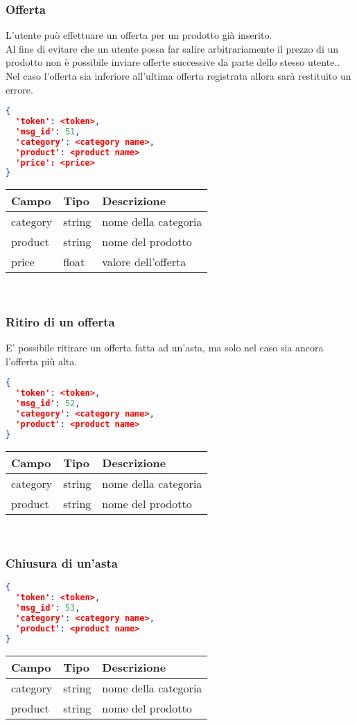 \subsubsection{Offerta}
L'utente può effettuare un offerta per un prodotto già inserito.\\
Al fine di evitare che un utente possa far salire arbitrariamente il prezzo di un prodotto non è possibile inviare offerte successive da parte dello stesso utente..\\
Nel caso l'offerta sia inferiore all'ultima offerta registrata allora sarà restituito un errore.
\begin{lstlisting}[language=json]
{
  'token': <token>,
  'msg_id': 51,
  'category': <category name>,
  'product': <product name>
  'price': <price>
}
\end{lstlisting}
\begin{tabular}{|l | l | l |}
\hline
Campo & Tipo & Descrizione \\ \hline
category & string & nome della categoria \\ \hline
product & string & nome del prodotto \\ \hline
price & float & valore dell'offerta \\ \hline
\end{tabular} \\

\subsubsection{Ritiro di un offerta}
E' possibile ritirare un offerta fatta ad un'asta, ma solo nel caso sia ancora l'offerta più alta.
\begin{lstlisting}[language=json]
{
  'token': <token>,
  'msg_id': 52,
  'category': <category name>,
  'product': <product name>
}
\end{lstlisting}
\begin{tabular}{|l | l | l |}
\hline
Campo & Tipo & Descrizione \\ \hline
category & string & nome della categoria \\ \hline
product & string & nome del prodotto \\ \hline
\end{tabular} \\

\subsubsection{Chiusura di un'asta}
\begin{lstlisting}[language=json]
{
  'token': <token>,
  'msg_id': 53,
  'category': <category name>,
  'product': <product name>
}
\end{lstlisting}
\begin{tabular}{|l | l | l |}
\hline
Campo & Tipo & Descrizione \\ \hline
category & string & nome della categoria \\ \hline
product & string & nome del prodotto \\ \hline
\end{tabular} \\
